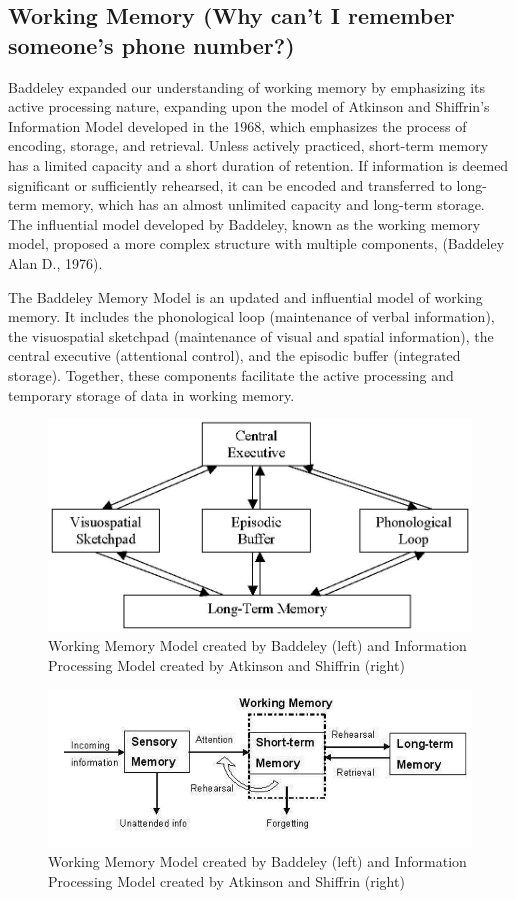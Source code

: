\documentclass[print]{nuthesis}
\begin{document}
\hypertarget{working-memory-why-cant-i-remember-someones-phone-number}{%
\subsection{Working Memory (Why can't I remember someone's phone number?)}\label{working-memory-why-cant-i-remember-someones-phone-number}}

Baddeley expanded our understanding of working memory by emphasizing its active processing nature, expanding upon the model of Atkinson and Shiffrin's Information Model developed in the 1968, which emphasizes the process of encoding, storage, and retrieval.
Unless actively practiced, short-term memory has a limited capacity and a short duration of retention.
If information is deemed significant or sufficiently rehearsed, it can be encoded and transferred to long-term memory, which has an almost unlimited capacity and long-term storage.
The influential model developed by Baddeley, known as the working memory model, proposed a more complex structure with multiple components, (Baddeley Alan D., 1976).

The Baddeley Memory Model is an updated and influential model of working memory.
It includes the phonological loop (maintenance of verbal information), the visuospatial sketchpad (maintenance of visual and spatial information), the central executive (attentional control), and the episodic buffer (integrated storage).
Together, these components facilitate the active processing and temporary storage of data in working memory.

\begin{figure}

{\centering \includegraphics[width=0.45\linewidth]{figure/Baddeley_model} 

}

\caption{Working Memory Model created by Baddeley (left) and Information Processing Model created by Atkinson and Shiffrin (right)}\label{fig:baddeleymodel-1}
\end{figure}
\begin{figure}

{\centering \includegraphics[width=0.45\linewidth]{figure/info_model} 

}

\caption{Working Memory Model created by Baddeley (left) and Information Processing Model created by Atkinson and Shiffrin (right)}\label{fig:baddeleymodel-2}
\end{figure}
\end{document}
